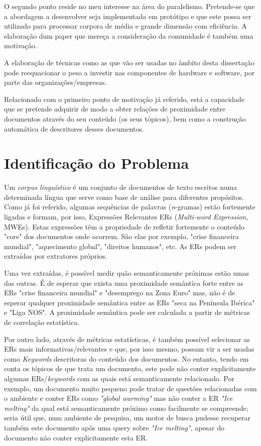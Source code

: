 O segundo ponto reside no meu interesse na área do paralelismo. Pretende-se que a abordagem a desenvolver seja implementada em protótipo e que este possa ser utilizado para processar corpora de média e grande dimensão com eficiência. A elaboração dum paper que mereça a consideração da comunidade é também uma motivação.

A elaboração de técnicas como as que vão ser usadas no âmbito desta dissertação pode reequacionar o peso a investir nas componentes de hardware e software, por parte das organizações/empresas.

Relacionado com o primeiro ponto de motivação já referido, está a capacidade que se pretende adquirir de modo a obter relações de proximidade entre documentos através do seu conteúdo (os seus tópicos), bem como a construção automática de descritores desses documentos. 

\section{Identificação do Problema} %
\label{sec:identificacao_problema}
Um \textit{corpus linguístico} é um conjunto de documentos de texto escritos numa determinada língua que serve como base de análise para diferentes propósitos. Como já foi referido, algumas sequências de palavras (\textit{n}-gramas) estão fortemente ligadas e formam, por isso, Expressões Relevantes ERs (\textit{Multi-word Expression}, MWEs). Estas expressões têm a propriedade de refletir fortemente o conteúdo "core" \thinspace dos documentos onde ocorrem. São elas por exemplo, "crise financeira mundial", "aquecimento global", "direitos humanos", etc. As ERs podem ser extraídas por extratores próprios.

Uma vez extraídas, é possível medir quão semanticamente próximas estão umas das outras. É de esperar que exista uma proximidade semântica forte entre as ERs "crise financeira mundial" \thinspace e "desemprego na Zona Euro" \thinspace mas, não é de esperar qualquer proximidade semântica entre as ERs "seca na Península Ibérica" \thinspace e "Liga NOS". A proximidade semântica pode ser calculada a partir de métricas de correlação estatística.

Por outro lado, através de métricas estatísticas, é também possível selecionar as ERs mais informativas/relevantes e que, por isso mesmo, possam vir a ser usadas como \textit{Keywords} descritoras do conteúdo dos documentos. No entanto, tendo em conta os tópicos de que trata um documento, este pode não conter explicitamente algumas ERs/\textit{keywords} com as quais está semanticamente relacionado. Por exemplo, um documento muito pequeno pode tratar de questões relacionadas com o ambiente e conter ERs como \textit{"global warming"} mas não conter a ER \textit{"Ice melting"} da qual está semanticamente próximo como facilmente se compreende; seria útil que, num ambiente de pesquisa, um motor de busca pudesse recuperar também este documento após uma query sobre \textit{"Ice melting"}, apesar do documento não conter explicitamente esta ER.

